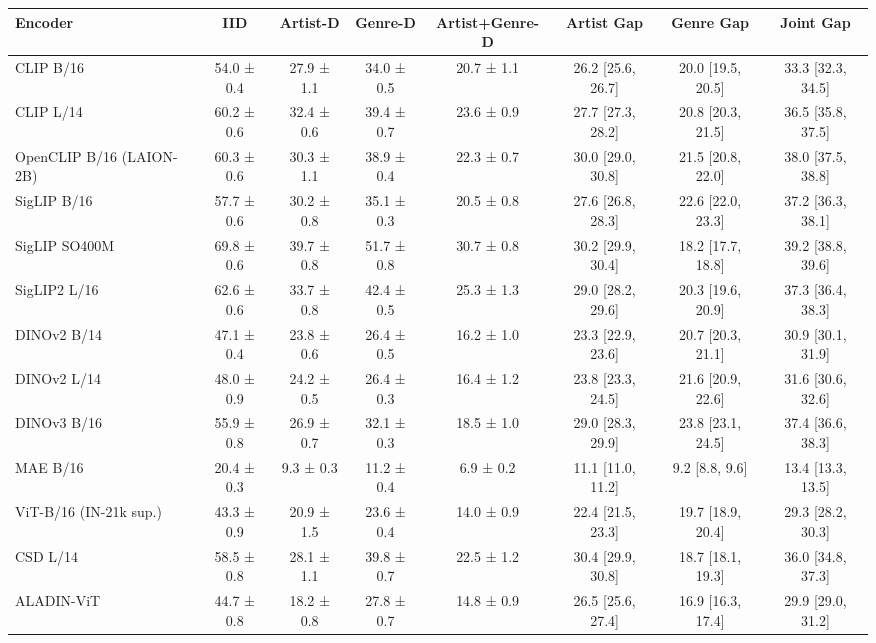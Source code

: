 \begin{tabular}{lccccccc}
\toprule
Encoder & IID & Artist-D & Genre-D & Artist+Genre-D & Artist Gap & Genre Gap & Joint Gap \\
\midrule
CLIP B/16 & 54.0 ± 0.4 & 27.9 ± 1.1 & 34.0 ± 0.5 & 20.7 ± 1.1 & 26.2 [25.6, 26.7] & 20.0 [19.5, 20.5] & 33.3 [32.3, 34.5] \\
CLIP L/14 & 60.2 ± 0.6 & 32.4 ± 0.6 & 39.4 ± 0.7 & 23.6 ± 0.9 & 27.7 [27.3, 28.2] & 20.8 [20.3, 21.5] & 36.5 [35.8, 37.5] \\
OpenCLIP B/16 (LAION-2B) & 60.3 ± 0.6 & 30.3 ± 1.1 & 38.9 ± 0.4 & 22.3 ± 0.7 & 30.0 [29.0, 30.8] & 21.5 [20.8, 22.0] & 38.0 [37.5, 38.8] \\
SigLIP B/16 & 57.7 ± 0.6 & 30.2 ± 0.8 & 35.1 ± 0.3 & 20.5 ± 0.8 & 27.6 [26.8, 28.3] & 22.6 [22.0, 23.3] & 37.2 [36.3, 38.1] \\
SigLIP SO400M & 69.8 ± 0.6 & 39.7 ± 0.8 & 51.7 ± 0.8 & 30.7 ± 0.8 & 30.2 [29.9, 30.4] & 18.2 [17.7, 18.8] & 39.2 [38.8, 39.6] \\
SigLIP2 L/16 & 62.6 ± 0.6 & 33.7 ± 0.8 & 42.4 ± 0.5 & 25.3 ± 1.3 & 29.0 [28.2, 29.6] & 20.3 [19.6, 20.9] & 37.3 [36.4, 38.3] \\
DINOv2 B/14 & 47.1 ± 0.4 & 23.8 ± 0.6 & 26.4 ± 0.5 & 16.2 ± 1.0 & 23.3 [22.9, 23.6] & 20.7 [20.3, 21.1] & 30.9 [30.1, 31.9] \\
DINOv2 L/14 & 48.0 ± 0.9 & 24.2 ± 0.5 & 26.4 ± 0.3 & 16.4 ± 1.2 & 23.8 [23.3, 24.5] & 21.6 [20.9, 22.6] & 31.6 [30.6, 32.6] \\
DINOv3 B/16 & 55.9 ± 0.8 & 26.9 ± 0.7 & 32.1 ± 0.3 & 18.5 ± 1.0 & 29.0 [28.3, 29.9] & 23.8 [23.1, 24.5] & 37.4 [36.6, 38.3] \\
MAE B/16 & 20.4 ± 0.3 & 9.3 ± 0.3 & 11.2 ± 0.4 & 6.9 ± 0.2 & 11.1 [11.0, 11.2] & 9.2 [8.8, 9.6] & 13.4 [13.3, 13.5] \\
ViT-B/16 (IN-21k sup.) & 43.3 ± 0.9 & 20.9 ± 1.5 & 23.6 ± 0.4 & 14.0 ± 0.9 & 22.4 [21.5, 23.3] & 19.7 [18.9, 20.4] & 29.3 [28.2, 30.3] \\
CSD L/14 & 58.5 ± 0.8 & 28.1 ± 1.1 & 39.8 ± 0.7 & 22.5 ± 1.2 & 30.4 [29.9, 30.8] & 18.7 [18.1, 19.3] & 36.0 [34.8, 37.3] \\
ALADIN-ViT & 44.7 ± 0.8 & 18.2 ± 0.8 & 27.8 ± 0.7 & 14.8 ± 0.9 & 26.5 [25.6, 27.4] & 16.9 [16.3, 17.4] & 29.9 [29.0, 31.2] \\
\bottomrule
\end{tabular}
